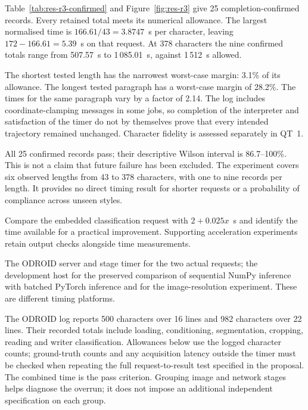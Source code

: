 Table~\ref{tab:res-r3-confirmed} and Figure~\ref{fig:res-r3} give 25 completion-confirmed records. Every retained total meets its numerical allowance. The largest normalised time is $166.61/43=3.8747$~s per character, leaving $172-166.61=5.39$~s on that request. At 378 characters the nine confirmed totals range from 507.57~s to 1\,085.01~s, against 1\,512~s allowed.



The shortest tested length has the narrowest worst-case margin: 3.1\% of its allowance. The longest tested paragraph has a worst-case margin of 28.2\%. The times for the same paragraph vary by a factor of 2.14. The log includes coordinate-clamping messages in some jobs, so completion of the interpreter and satisfaction of the timer do not by themselves prove that every intended trajectory remained unchanged. Character fidelity is assessed separately in QT~1.

All 25 confirmed records pass; their descriptive Wilson interval is 86.7--100\%. This is not a claim that future failure has been excluded. The experiment covers six observed lengths from 43 to 378 characters, with one to nine records per length. It provides no direct timing result for shorter requests or a probability of compliance across unseen styles.

Compare the embedded classification request with $2+0.025x$~s and identify the time available for a practical improvement. Supporting acceleration experiments retain output checks alongside time measurements.

The ODROID server and stage timer for the two actual requests; the development host for the preserved comparison of sequential NumPy inference with batched PyTorch inference and for the image-resolution experiment. These are different timing platforms.

The ODROID log reports 500 characters over 16 lines and 982 characters over 22 lines. Their recorded totals include loading, conditioning, segmentation, cropping, reading and writer classification. Allowances below use the logged character counts; ground-truth counts and any acquisition latency outside the timer must be checked when repeating the full request-to-result test specified in the proposal. The combined time is the pass criterion. Grouping image and network stages helps diagnose the overrun; it does not impose an additional independent specification on each group.

